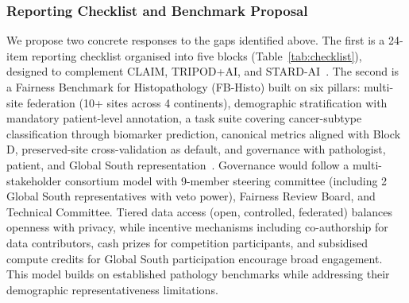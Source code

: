 \subsubsection{Reporting Checklist and Benchmark Proposal}
\label{sec:discussion:agenda:checklist}
We propose two concrete responses to the gaps identified above. The first is a 24-item reporting checklist organised into five blocks (Table~\ref{tab:checklist}), designed to complement CLAIM, TRIPOD+AI, and STARD-AI~\citep{sounderajah2021stardai}. The second is a Fairness Benchmark for Histopathology (FB-Histo) built on six pillars: multi-site federation (10+ sites across 4 continents), demographic stratification with mandatory patient-level annotation, a task suite covering cancer-subtype classification through biomarker prediction, canonical metrics aligned with Block D, preserved-site cross-validation as default, and governance with pathologist, patient, and Global South representation~\citep{howard2021site, vaidya2024demographic, zong2023medfair}. Governance would follow a multi-stakeholder consortium model with 9-member steering committee (including 2 Global South representatives with veto power), Fairness Review Board, and Technical Committee. Tiered data access (open, controlled, federated) balances openness with privacy, while incentive mechanisms including co-authorship for data contributors, cash prizes for competition participants, and subsidised compute credits for Global South participation encourage broad engagement. This model builds on established pathology benchmarks while addressing their demographic representativeness limitations.

